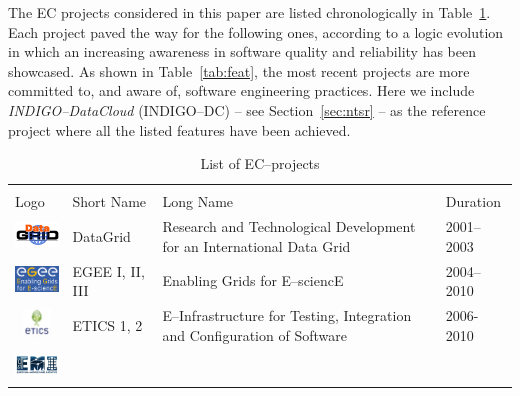 The EC projects considered in this paper are listed chronologically in Table~\ref{tab:eup}.
Each project paved the way for the following ones, according to a logic evolution in which
an increasing awareness in software quality and reliability has been showcased. As shown in 
Table~\ref{tab:feat}, the most recent projects are more committed to, and aware of, software
engineering practices. Here we include {\sl INDIGO--DataCloud} (INDIGO--DC) -- see 
Section~\ref{sec:ntsr} -- as the reference project where all the listed features have been achieved.

\begin{table}[!h]
\renewcommand{\arraystretch}{1.3}
\caption{List of EC--projects}
\label{tab:eup}
\centering
\begin{tabular}{p{1.6cm}p{2cm}p{5cm}l}
\hline
\hline
\\
Logo & Short Name & Long Name & Duration\\
\hline
\hline
\begin{minipage}{.3\textwidth}
\includegraphics[width=15mm,height=7.5mm]{images/datagrid}
\end{minipage}
    & DataGrid &
Research and Technological Development for an International Data Grid & 2001--2003\\
\begin{minipage}{.3\textwidth}
\includegraphics[width=15mm,height=7.5mm]{images/egee}
\end{minipage}
     & EGEE I, II, III &
Enabling Grids for E--sciencE & 2004--2010\\
\begin{minipage}{.3\textwidth}
\includegraphics[width=15mm,height=7.5mm]{images/etics}
\end{minipage}
     & ETICS 1, 2 &
E--Infrastructure for Testing, Integration and Configuration of Software & 2006-2010\\
\begin{minipage}{.3\textwidth}
\includegraphics[width=15mm,height=7.5mm]{images/emi}

\end{minipage}
\end{tabular}
\end{table}
